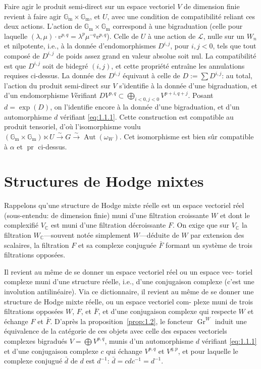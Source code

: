 \documentclass[12pt,a4paper]{article}
\theoremstyle{plain}
\theoremstyle{definition}
\DeclareMathOperator{\Gr}{Gr}
\DeclareMathOperator{\Aut}{Aut}
\DeclareMathOperator{\pr}{pr}
\newcommand{\Gm}{\mathbb{G}_\mathrm{m}}
\newcommand{\C}{\mathbb{C}}
\begin{document}
Faire agir le produit semi-direct sur un espace vectoriel $V$ de dimension
finie revient \`{a} faire agir $\Gm \times \Gm$, et $U$, avec une condition de compatibilit\'{e}
reliant ces deux actions. L'action de $\Gm \times \Gm$ correspond \`{a} une bigraduation
(celle pour laquelle $(\lambda, \mu) \cdot v^{p,q} = \lambda^p \mu^{-q} v^{p,q}$). Celle de $U$ \`{a} une action
de $\mathcal{L}$, nulle sur un $W_n$ et nilpotente, i.e., \`{a} la donn\'{e}e d'endomorphismes
$D^{i,j}$, pour $i, j < 0$, tels que tout compos\'{e} de $D^{i,j}$ de poids assez grand en
valeur absolue soit nul. La compatibilit\'{e} est que $D^{i,j}$ soit de bidegr\'{e} $(i, j)$,
et cette propri\'{e}t\'{e} entra\^{i}ne les annulations requises ci-dessus. La donn\'{e}e des
$D^{i,j}$ \'{e}quivaut \`{a} celle de $D := \sum D^{i,j}$: au total, l'action du produit semi-direct
sur $V$ s'identifie \`{a} la donn\'{e}e d'une bigraduation, et d'un endomorphisme
$V$\'{e}rifiant $D V^{p,q} \subset \bigoplus_{i<0, j<0} V^{p+i,q+j}$. Posant $d = \exp(D)$, on l'identifie encore
\`{a} la donn\'{e}e d'une bigraduation, et d'un automorphisme $d$ v\'{e}rifiant \eqref{eq:1.1.1}.
Cette construction est compatible au produit tensoriel, d'o\`{u} l'isomorphisme
voulu $(\Gm \times \Gm) \ltimes U \xrightarrow{\sim} G \xrightarrow{\sim} \Aut(\omega_W)$. Cet isomorphisme est bien s\^{u}r
compatible \`{a} $\alpha$ et $\pr$ ci-dessus.

\section{Structures de Hodge mixtes}

Rappelons qu'une structure de Hodge mixte r\'{e}elle est un espace vectoriel
r\'{e}el (sous-entendu: de dimension finie) muni d'une filtration croissante $W$
et dont le complexifi\'{e} $V_\C$ est muni d'une filtration d\'{e}croissante $F$. On
exige que sur $V_\C$ la filtration $W_\C$---souvent not\'{e}e simplement $W$---d\'{e}duite
de $W$ par extension des scalaires, la filtration $F$ et sa complexe conjugu\'{e}e
$\bar{F}$ formant un syst\`{e}me de trois filtrations oppos\'{e}es.

Il revient au m\^{e}me de se donner un espace vectoriel r\'{e}el ou un espace vec-
toriel complexe muni d'une structure r\'{e}elle, i.e., d'une conjugaison complexe
(c'est une involution antilin\'{e}aire). Via ce dictionnaire, il revient au m\^{e}me de
se donner une structure de Hodge mixte r\'{e}elle, ou un espace vectoriel com-
plexe muni de trois filtrations oppos\'{e}es $W$, $F$, et $\bar{F}$, et d'une conjugaison
complexe qui respecte $W$ et \'{e}change $F$ et $\bar{F}$. D'apr\`{e}s la proposition~\ref{prop:1.2},
le foncteur $\Gr^W$ induit une \'{e}quivalence de la cat\'{e}gorie de ces objets avec
celle des espaces vectoriels complexes bigradu\'{e}s $V = \bigoplus V^{p,q}$, munis d'un
automorphisme $d$ v\'{e}rifiant \eqref{eq:1.1.1} et d'une conjugaison complexe $c$ qui
\'{e}change $V^{p,q}$ et $V^{q,p}$, et pour laquelle le complexe conjugu\'{e} $\bar{d}$ de $d$ est
$d^{-1}$: $\bar{d} = c d c^{-1} = d^{-1}$.
\end{document}
